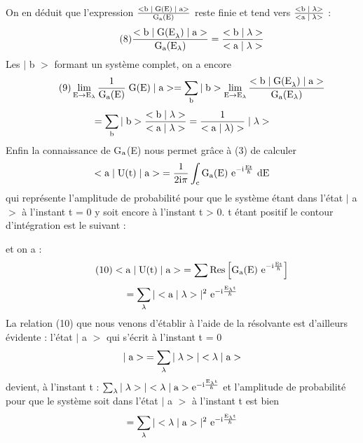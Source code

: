 On en déduit que l'expression $\frac{<\text{b}\;|\;\text{G(E)}\;|\;\text{a}>}{\text{G}_{\text{a}}(\text{E})}$
reste finie et tend vers $\frac{<\text{b}\;|\;\lambda>}{<\text{a}\;|\;\lambda>}$ :
\[
\tag{8}\frac{<\text{b}\;|\;\text{G(E}_\lambda)\;|\;\text{a}>}{\text{G}_{\text{a}}(\text{E}_\lambda)}=
\frac{<\text{b}\;|\;\lambda>}{<\text{a}\;|\;\lambda>}
\]
Les $|$ b $>$ formant un système complet, on a encore
\[
\tag{9}\lim_{\text{E}\to\text{E}_\lambda}\frac{1}{\text{G}_{\text{a}}(\text{E})}\;\text{G(E)}\;|\;\text{a}>=
\sum_{\text{b}}|\;\text{b}>\lim_{\text{E}\to\text{E}_\lambda}
\frac{<\text{b}\;|\;\text{G(E}_\lambda)\;|\;\text{a}>}{\text{G}_{\text{a}}(\text{E}_\lambda)}
\]
\[
=\sum_{\text{b}}|\;\text{b}>\frac{<\text{b}\;|\;\lambda>}{<\text{a}\;|\;\lambda>}=
\frac{1}{<\text{a}\;|\;\lambda)>}\;|\;\lambda>
\]
Enfin la connaissance de G$_{\text{a}}$(E) nous permet grâce à (3) de calculer
\[
<\text{a}\;|\;\text{U(t)}\;|\;\text{a}>\;=\frac{1}{2\text{i}\pi}\int_{\text{c}}\text{G}_{\text{a}}
\text{(E) e}^{-\text{i}\frac{\text{Et}}{\hbar}}\text{ dE}
\]
qui représente l'amplitude de probabilité pour que le système étant dans l'état $|$ a $>$
à l'instant t = 0 y soit encore à l'instant t > 0. t étant positif le contour d'intégration est le suivant :
\begin{center}
\end{center}
et on a :
\[
\tag{10}<\text{a}\;|\;\text{U(t)}\;|\;\text{a}>\;=\sum\text{Res}\left[\text{G}_{\text{a}}\text{(E) e}^{-\text{i}
\frac{\text{Et}}{\hbar}}\right]
\]
\[
=\sum_\lambda|<\text{a}\;|\;\lambda>|^2\text{ e}^{-\text{i}\frac{\text{E}_\lambda\text{t}}{\hbar}}
\]
La relation (10) que nous venons d'établir à l'aide de la résolvante est d'ailleurs
évidente : l'état $|$ a $>$ qui s'écrit à l'instant t = 0
\[
|\;\text{a}>\;=\sum_\lambda|\;\lambda>|<\lambda\;|\;\text{a}>
\]
devient, à l'instant t : $\sum_\lambda|\;\lambda>|<\lambda\;|\;\text{a}>
\text{e}^{-\text{i}\frac{\text{E}_\lambda\text{t}}{\hbar}}$
et l'amplitude de probabilité pour que le système soit dans l'état $|$ a $>$ à l'instant t est bien
\[
=\sum_\lambda|<\lambda\;|\;\text{a}>|^2\text{ e}^{-\text{i}\frac{\text{E}_\lambda\text{t}}{\hbar}}
\]
